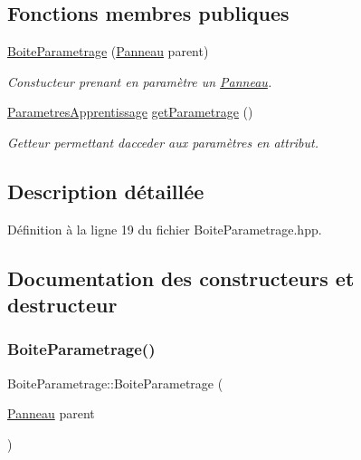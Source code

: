 \subsection*{Fonctions membres publiques}
\begin{DoxyCompactItemize}
\item 
\hyperlink{class_boite_parametrage_a5c4d9098fac45ee4dc7ff2d6d8e910bb}{Boite\+Parametrage} (\hyperlink{class_panneau}{Panneau} parent)
\begin{DoxyCompactList}\small\item\em Constucteur prenant en paramètre un \hyperlink{class_panneau}{Panneau}. \end{DoxyCompactList}\item 
\hyperlink{class_parametres_apprentissage}{Parametres\+Apprentissage} \hyperlink{class_boite_parametrage_ad7c3de61949e05469a73e6b8369205e2}{get\+Parametrage} ()
\begin{DoxyCompactList}\small\item\em Getteur permettant d\textquotesingle{}acceder aux paramètres en attribut. \end{DoxyCompactList}\end{DoxyCompactItemize}


\subsection{Description détaillée}


Définition à la ligne 19 du fichier Boite\+Parametrage.\+hpp.



\subsection{Documentation des constructeurs et destructeur}
\mbox{\label{class_boite_parametrage_a5c4d9098fac45ee4dc7ff2d6d8e910bb}} 
\subsubsection{\texorpdfstring{Boite\+Parametrage()}{BoiteParametrage()}}
{\footnotesize\ttfamily Boite\+Parametrage\+::\+Boite\+Parametrage (\begin{DoxyParamCaption}\item[{\hyperlink{class_panneau}{Panneau}}]{parent }\end{DoxyParamCaption})}



